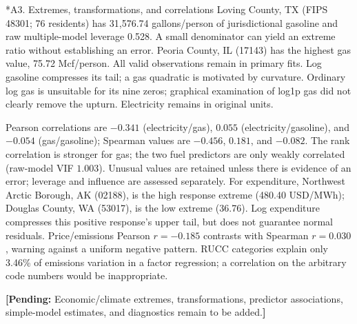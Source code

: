 \documentclass[11pt,letterpaper]{article}
\makeatletter
\renewcommand\subsection{\@startsection{subsection}{2}{0pt}{1.2ex plus .3ex minus .2ex}{.5ex}{\normalfont\normalsize\bfseries}}
\newcommand{\placeholder}[1]{\par{\small\color{blue!55!black}\textbf{[Pending:} #1\textbf{]}}\par}
\makeatother
\begin{document}
\subsection*{A3. Extremes, transformations, and correlations}
Loving County, TX (FIPS 48301; 76 residents) has 31,576.74 gallons/person of jurisdictional gasoline and raw multiple-model leverage 0.528. A small denominator can yield an extreme ratio without establishing an error. Peoria County, IL (17143) has the highest gas value, 75.72 Mcf/person. All valid observations remain in primary fits. Log gasoline compresses its tail; a gas quadratic is motivated by curvature. Ordinary log gas is unsuitable for its nine zeros; graphical examination of log1p gas did not clearly remove the upturn. Electricity remains in original units.

Pearson correlations are $-0.341$ (electricity/gas), $0.055$ (electricity/gasoline), and $-0.054$ (gas/gasoline); Spearman values are $-0.456$, $0.181$, and $-0.082$. The rank correlation is stronger for gas; the two fuel predictors are only weakly correlated (raw-model VIF $1.003$). Unusual values are retained unless there is evidence of an error; leverage and influence are assessed separately.
For expenditure, Northwest Arctic Borough, AK (02188), is the high response extreme (480.40 USD/MWh); Douglas County, WA (53017), is the low extreme (36.76). Log expenditure compresses this positive response's upper tail, but does not guarantee normal residuals. Price/emissions Pearson $r=-0.185$ contrasts with Spearman $r=0.030$, warning against a uniform negative pattern. RUCC categories explain only 3.46\% of emissions variation in a factor regression; a correlation on the arbitrary code numbers would be inappropriate.
\placeholder{Economic/climate extremes, transformations, predictor associations, simple-model estimates, and diagnostics remain to be added.}
\end{document}
